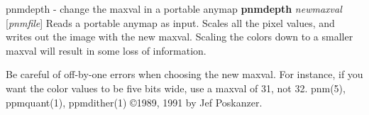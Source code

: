 %

\newpage
%

pnmdepth - change the maxval in a portable anymap
{\bf pnmdepth}
{\it newmaxval}
{\rm [}{\it pnmfile}{\rm ]}
Reads a portable anymap as input.
Scales all the pixel values, and writes out the image with the new maxval.
Scaling the colors down to a smaller maxval will result in some loss
of information.
\par
Be careful of off-by-one errors when choosing the new maxval.
For instance, if you want the color values to be five bits wide,
use a maxval of 31, not 32.
pnm(5), ppmquant(1), ppmdither(1)
\copyright 1989, 1991 by Jef Poskanzer.
%
 
%

\newpage
%


